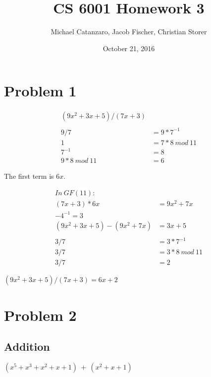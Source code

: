 \documentclass[letterpaper]{article}
\title{CS 6001 Homework 3}
\author{Michael Catanzaro, Jacob Fischer, Christian Storer}
\date{October 21, 2016}
\begin{document}
\maketitle

\section{Problem 1}


\begin{equation*}
  \begin{split}
    (9x^2+3x+5) / (7x+3) \\
    \\
    9/7 &= 9*7^{-1} \\
    1 &= 7*8\ mod\ 11 \\
    7^{-1} &= 8 \\
    9*8\ mod\ 11 &= 6
  \end{split}
\end{equation*}

The first term is \(6x\).


\begin{equation*}
  \begin{split}
    In\  GF(11): \\
    (7x+3)*6x &= 9x^2+7x \\
    -4^{-1} = 3 \\
    (9x^2+3x+5) - (9x^2+7x) &= 3x + 5 \\
    \\
    3/7 &= 3*7^{-1} \\
    3/7 &= 3*8\ mod\ 11 \\
    3/7 &= 2
  \end{split}
\end{equation*}

\((9x^2+3x+5) / (7x+3) = 6x + 2\)


\section{Problem 2}

\subsection{Addition}

\((x^5 + x^3 + x^2 + x + 1)\ +\ (x^2 + x + 1)\)
\end{document}
